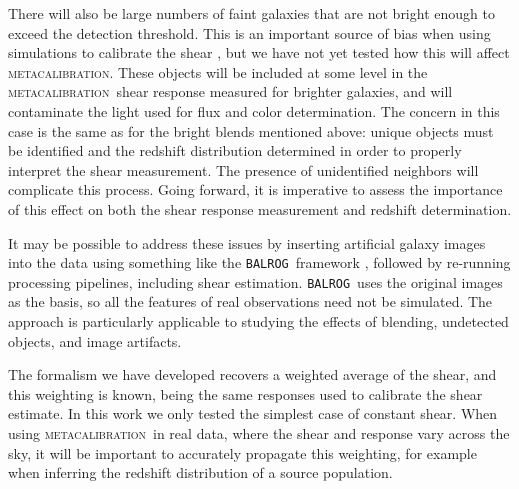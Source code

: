 \documentclass[iop]{emulateapj}
\newcommand{\mcal}{\textsc{metacalibration}}
\newcommand{\balrog}{\texttt{BALROG}}
\begin{document}
There will also be large numbers of faint galaxies that are not bright enough
to exceed the detection threshold. This is an important source of bias when
using simulations to calibrate the shear \citep[see e.g.][]{Hoekstra2017}, but
we have not yet tested how this will affect \mcal.  These objects will be
included at some level in the \mcal\ shear response measured for brighter
galaxies, and will contaminate the light used for flux and color determination.
The concern in this case is the same as for the bright blends mentioned above:
unique objects must be identified and the redshift distribution determined in
order to properly interpret the shear measurement.  The presence of
unidentified neighbors will complicate this process.   Going forward, it is
imperative to assess the importance of this effect on both the shear response
measurement and redshift determination.  

It may be possible to address these issues by inserting artificial galaxy
images into the data using something like the \balrog\ framework
\citep{Balrog2016}, followed by re-running processing pipelines, including
shear estimation.  \balrog\ uses the original images as the basis, so all the
features of real observations need not be simulated.  The approach is
particularly applicable to studying the effects of blending, undetected
objects, and image artifacts.

The formalism we have developed recovers a weighted average of the shear, and
this weighting is known, being the same responses used to calibrate the shear
estimate.  In this work we only tested the simplest case of constant shear.
When using \mcal\ in real data, where the shear and response vary across the
sky, it will be important to accurately propagate this weighting, for example
when inferring the redshift distribution of a source population.

\end{document}
